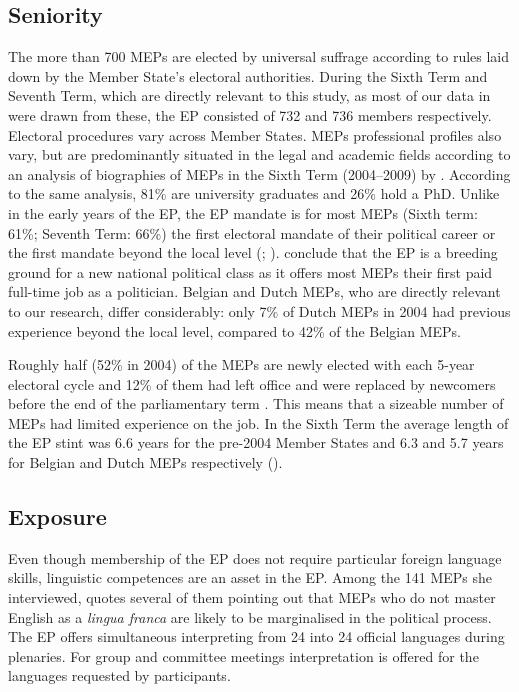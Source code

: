 \documentclass[output=paper]{langscibook}
\begin{document}
\subsection{Seniority}\label{sec:defrancq:3.1}

The more than 700 MEPs are elected by universal suffrage according to rules laid down by the Member State’s electoral authorities. During the Sixth Term and Seventh Term, which are directly relevant to this study, as most of our data in  were drawn from these, the EP consisted of 732 and 736 members respectively. Electoral procedures vary across Member States. MEPs professional profiles also vary, but are predominantly situated in the legal and academic fields according to an analysis of biographies of MEPs in the Sixth Term (2004--2009) by \citet{BeauvalletMichon2010}. According to the same analysis, 81\% are university graduates and 26\% hold a PhD. Unlike in the early years of the EP, the EP mandate is for most MEPs (Sixth term: 61\%; Seventh Term: 66\%) the first electoral mandate of their political career or the first mandate beyond the local level (\citealt{BeauvalletMichon2010}; \citealt{BeauvalletEtAl2013}). \citet{BeauvalletMichon2010} conclude that the EP is a breeding ground for a new national political class as it offers most MEPs their first paid full-time job as a politician. Belgian and Dutch MEPs, who are directly relevant to our research, differ considerably: only 7\% of Dutch MEPs in 2004 had previous experience beyond the local level, compared to 42\% of the Belgian MEPs.

Roughly half (52\% in 2004) of the MEPs are newly elected with each 5-year electoral cycle and 12\% of them had left office and were replaced by newcomers before the end of the parliamentary term \citep{Whitacker2014}. This means that a sizeable number of MEPs had limited experience on the job. In the Sixth Term the average length of the EP stint was 6.6 years for the pre-2004 Member States and 6.3 and 5.7 years for Belgian and Dutch MEPs respectively (\citealt{BeauvalletMichon2010}). 

\subsection{Exposure}\label{sec:defrancq:3.2}

Even though membership of the EP does not require particular foreign language skills, linguistic competences are an asset in the EP. Among the 141 MEPs she interviewed, \citet{Wright2007} quotes several of them pointing out that MEPs who do not master English as a \textit{lingua franca} are likely to be marginalised in the political process. The EP offers simultaneous interpreting from 24 into 24 official languages during plenaries. For group and committee meetings interpretation is offered for the languages requested by participants.  
\end{document}
